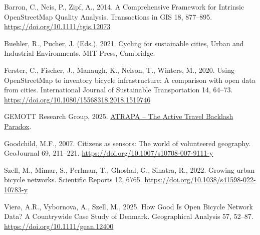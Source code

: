 \documentclass[
  preprint, 3p, authoryear]{article}
\newlength{\cslhangindent}
\newenvironment{CSLReferences}[2] %
 {\begin{list}{}{%
  \setlength{\itemindent}{0pt}
  \setlength{\leftmargin}{0pt}
  \setlength{\parsep}{0pt}
  \ifodd #1
   \setlength{\leftmargin}{\cslhangindent}
   \setlength{\itemindent}{-1\cslhangindent}
  \fi
  \setlength{\itemsep}{#2\baselineskip}}}
 {\end{list}}
\begin{document}
\label{refs}
\begin{CSLReferences}{1}{0}
Barron, C., Neis, P., Zipf, A., 2014. A {Comprehensive} {Framework} for
{Intrinsic} {OpenStreetMap} {Quality} {Analysis}. Transactions in GIS
18, 877--895. \url{https://doi.org/10.1111/tgis.12073}

Buehler, R., Pucher, J. (Eds.), 2021. Cycling for sustainable cities,
Urban and {Industrial} {Environments}. MIT Press, Cambridge.

Ferster, C., Fischer, J., Manaugh, K., Nelson, T., Winters, M., 2020.
Using {OpenStreetMap} to inventory bicycle infrastructure: {A}
comparison with open data from cities. International Journal of
Sustainable Transportation 14, 64--73.
\url{https://doi.org/10.1080/15568318.2018.1519746}

GEMOTT Research Group, 2025.
\href{https://webs.uab.cat/atrapa/}{{ATRAPA} -- {The} {Active} {Travel}
{Backlash} {Paradox}}.

Goodchild, M.F., 2007. Citizens as sensors: The world of volunteered
geography. GeoJournal 69, 211--221.
\url{https://doi.org/10.1007/s10708-007-9111-y}

Szell, M., Mimar, S., Perlman, T., Ghoshal, G., Sinatra, R., 2022.
Growing urban bicycle networks. Scientific Reports 12, 6765.
\url{https://doi.org/10.1038/s41598-022-10783-y}

Vierø, A.R., Vybornova, A., Szell, M., 2025. How {Good} {Is} {Open}
{Bicycle} {Network} {Data}? {A} {Countrywide} {Case} {Study} of
{Denmark}. Geographical Analysis 57, 52--87.
\url{https://doi.org/10.1111/gean.12400}

\end{CSLReferences}
\end{document}
